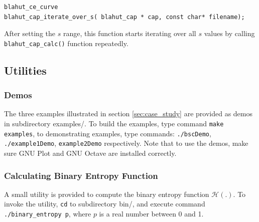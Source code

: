 \documentclass[a4paper,10pt]{article}
\begin{document}
\begin{verbatim}
blahut_ce_curve 
blahut_cap_iterate_over_s( blahut_cap * cap, const char* filename);
\end{verbatim}
After setting the $s$ range, this function starts iterating over all $s$ values by calling \verb|blahut_cap_calc()| function repeatedly.

\subsection{Utilities}
\subsubsection{Demos}
The three examples illustrated in section \ref{sec:case_study} are provided as demos in subdirectory examples/. To build the examples, type command \verb|make examples|, to demonstrating examples, type commands: \verb|./bscDemo|, \verb|./example1Demo|, \verb|example2Demo| respectively. Note that to use the demos, make sure GNU Plot and GNU Octave are installed correctly.

\subsubsection{Calculating Binary Entropy Function}
A small utility is provided to compute the binary entropy function $\mathcal{H}(.)$. To invoke the utility, \verb|cd| to subdirectory bin/, and execute command \verb|./binary_entropy p|, where $p$ is a real number between 0 and 1.
 
\end{document}
